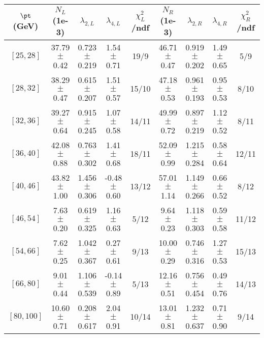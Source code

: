\begin{tabular}{c||c|c|c|c||c|c|c|c}
$\pt$ (GeV) & $N_L$ (1e-3) & $\lambda_{2,L}$ & $\lambda_{4,L}$  & $\chi^2_L$/ndf & $N_R$ (1e-3) & $\lambda_{2,R}$ & $\lambda_{4,R}$  & $\chi^2_R$/ndf \\
\hline
$[25, 28]$ & 37.79$\pm$0.42 & 0.723$\pm$0.219 & 1.54$\pm$0.71 & 19/9 & 46.71$\pm$0.47 & 0.919$\pm$0.202 & 1.49$\pm$0.65 & 5/9\\
$[28, 32]$ & 38.29$\pm$0.47 & 0.615$\pm$0.207 & 1.51$\pm$0.57 & 15/10 & 47.18$\pm$0.53 & 0.961$\pm$0.193 & 0.95$\pm$0.53 & 8/10\\
$[32, 36]$ & 39.27$\pm$0.64 & 0.915$\pm$0.245 & 1.07$\pm$0.58 & 14/11 & 49.99$\pm$0.72 & 0.897$\pm$0.219 & 1.12$\pm$0.52 & 8/11\\
$[36, 40]$ & 42.08$\pm$0.88 & 0.763$\pm$0.302 & 1.41$\pm$0.68 & 18/11 & 52.09$\pm$0.99 & 1.215$\pm$0.284 & 0.58$\pm$0.64 & 12/11\\
$[40, 46]$ & 43.82$\pm$1.00 & 1.456$\pm$0.306 & -0.48$\pm$0.60 & 13/12 & 57.01$\pm$1.14 & 1.149$\pm$0.266 & 0.66$\pm$0.52 & 8/12\\
$[46, 54]$ & 7.63$\pm$0.20 & 0.619$\pm$0.325 & 1.16$\pm$0.63 & 5/12 & 9.64$\pm$0.23 & 1.118$\pm$0.303 & 0.59$\pm$0.58 & 11/12\\
$[54, 66]$ & 7.62$\pm$0.25 & 1.042$\pm$0.367 & 0.27$\pm$0.61 & 9/13 & 10.00$\pm$0.29 & 0.746$\pm$0.316 & 1.27$\pm$0.53 & 15/13\\
$[66, 80]$ & 9.01$\pm$0.44 & 1.106$\pm$0.539 & -0.14$\pm$0.89 & 5/13 & 12.16$\pm$0.51 & 0.756$\pm$0.454 & 0.49$\pm$0.76 & 14/13\\
$[80, 100]$ & 10.60$\pm$0.71 & 0.208$\pm$0.617 & 2.04$\pm$0.91 & 10/14 & 13.01$\pm$0.81 & 1.232$\pm$0.637 & 0.71$\pm$0.90 & 9/14\\
\end{tabular}
